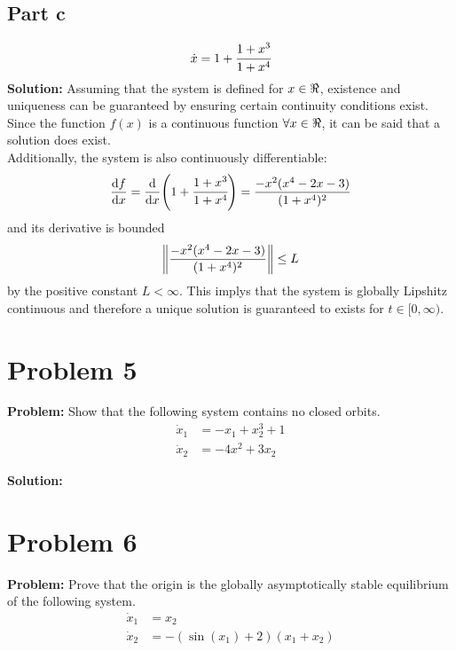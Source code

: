 \documentclass[letter]{article}
\numberwithin{equation}{section}
\begin{document}
\subsection{Part c}
\begin{equation}
	\dot{x} = 1 + \cfrac{1 + x^3}{1 + x^4}
\end{equation}
\noindent
\textbf{Solution:}
Assuming that the system is defined for $x\in \real$, existence and uniqueness can be guaranteed by ensuring certain continuity conditions exist.\\
Since the function $f(x)$ is a continuous function $\forall x \in \real$, it can be said that a solution does exist.\\
Additionally, the system is also continuously differentiable:
$$\dv{f}{x} = \dv{x} \qty(1 + \cfrac{1 + x^3}{1 + x^4}) = \frac{-x^2(x^4 - 2x - 3)}{(1+x^4)^2}$$
and its derivative is bounded
$$\norm{\frac{-x^2(x^4 - 2x - 3)}{(1+x^4)^2}} \leq L$$
by the positive constant $L < \infty$. This implys that the system is globally Lipshitz continuous and therefore a unique solution is guaranteed to exists for $t \in [0,\infty)$.

\newpage
\section{Problem 5}
\textbf{Problem:}
Show that the following system contains no closed orbits.
\begin{equation}
	\begin{aligned}
		\dot{x}_1 &= -x_1 + x_2^3 + 1\\
		\dot{x}_2 &= -4x^2 + 3 x_2
	\end{aligned}
\end{equation}

\noindent
\textbf{Solution:}








\newpage
\section{Problem 6}
\textbf{Problem:}
Prove that the origin is the globally asymptotically stable equilibrium of the following system.
\begin{equation}
	\begin{aligned}
		\dot{x}_1 &= x_2\\
		\dot{x}_2 &= -(\sin(x_1) + 2)(x_1 + x_2)
	\end{aligned}
\end{equation}
\end{document}
